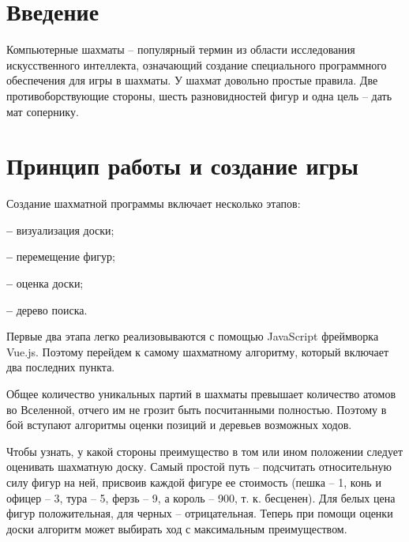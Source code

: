 \documentclass[a4paper,11pt,twoside]{article}
\begin{document}
% 

% 

\begin{multicols}{2}
% 
\section*{%
Введение}\vspace{-10pt}%

Компьютерные шахматы – популярный термин из области исследования искусственного интеллекта, означающий создание специального программного обеспечения для игры в шахматы. У шахмат довольно простые правила. Две противоборствующие стороны, шесть разновидностей фигур и одна цель – дать мат сопернику.
% 
\section{%
Принцип работы и создание игры
}\vspace{-10pt}%
Создание шахматной программы включает несколько этапов:

\textbf{–} визуализация доски;

\textbf{–} перемещение фигур;

\textbf{–} оценка доски;

\textbf{–} дерево поиска.

Первые два этапа легко реализовываются с помощью JavaScript фреймворка Vue.js. Поэтому перейдем к самому шахматному алгоритму, который включает два последних пункта.

Общее количество уникальных партий в шахматы превышает количество атомов во Вселенной, отчего им не грозит быть посчитанными полностью. Поэтому в бой вступают алгоритмы оценки позиций и деревьев возможных ходов.

Чтобы узнать, у какой стороны преимущество в том или ином положении следует оценивать шахматную доску. Самый простой путь – подсчитать относительную силу фигур на ней, присвоив каждой фигуре ее стоимость (пешка – 1, конь и офицер – 3, тура – 5, ферзь – 9, а король – 900, т. к. бесценен). Для белых цена фигур положительная, для черных – отрицательная. Теперь при помощи оценки доски алгоритм может выбирать ход с максимальным преимуществом.


\end{multicols}
\end{document}
